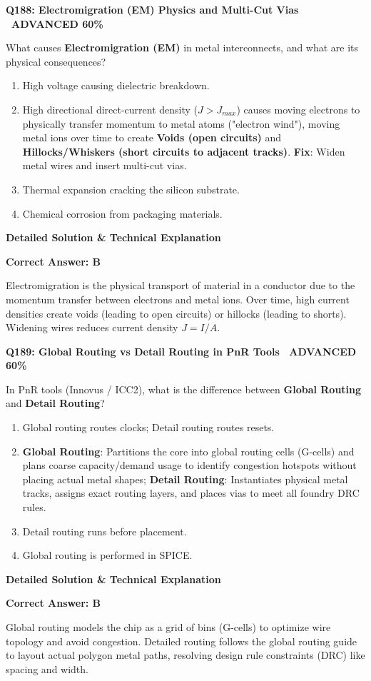 \documentclass[11pt,a4paper]{article}
\newcommand{\badgeadv}{{\color{white}\colorbox{advred}{\bfseries\sffamily\tiny\ ADVANCED 60\%\ }}}
\newenvironment{qbox}[2]{%
  \begin{mdframed}[style=qstyle]%
  {\bfseries\sffamily\color{primaryblue}#1 \hfill #2}\par\vspace{2pt}%
}{%
  \end{mdframed}%
}
\newenvironment{ansbox}{%
  \begin{mdframed}[style=ansstyle]%
  {\bfseries\sffamily\color{ansgreen}\small Detailed Solution \& Technical Explanation}\par\vspace{2pt}\small%
}{%
  \end{mdframed}%
}
\begin{document}
\begin{qbox}{Q188: Electromigration (EM) Physics and Multi-Cut Vias}{\badgeadv}
What causes \textbf{Electromigration (EM)} in metal interconnects, and what are its physical consequences?
\begin{enumerate}[label=\textbf{\Alph*.}]
  \item High voltage causing dielectric breakdown.
  \item High directional direct-current density ($J > J_{max}$) causes moving electrons to physically transfer momentum to metal atoms ("electron wind"), moving metal ions over time to create \textbf{Voids (open circuits)} and \textbf{Hillocks/Whiskers (short circuits to adjacent tracks)}.  
  \textbf{Fix}: Widen metal wires and insert multi-cut vias.
  \item Thermal expansion cracking the silicon substrate.
  \item Chemical corrosion from packaging materials.
\end{enumerate}
\end{qbox}
\begin{ansbox}
\textbf{Correct Answer: B}

Electromigration is the physical transport of material in a conductor due to the momentum transfer between electrons and metal ions. Over time, high current densities create voids (leading to open circuits) or hillocks (leading to shorts). Widening wires reduces current density $J = I/A$.
\end{ansbox}

\begin{qbox}{Q189: Global Routing vs Detail Routing in PnR Tools}{\badgeadv}
In PnR tools (Innovus / ICC2), what is the difference between \textbf{Global Routing} and \textbf{Detail Routing}?
\begin{enumerate}[label=\textbf{\Alph*.}]
  \item Global routing routes clocks; Detail routing routes resets.
  \item \textbf{Global Routing}: Partitions the core into global routing cells (G-cells) and plans coarse capacity/demand usage to identify congestion hotspots without placing actual metal shapes; \textbf{Detail Routing}: Instantiates physical metal tracks, assigns exact routing layers, and places vias to meet all foundry DRC rules.
  \item Detail routing runs before placement.
  \item Global routing is performed in SPICE.
\end{enumerate}
\end{qbox}
\begin{ansbox}
\textbf{Correct Answer: B}

Global routing models the chip as a grid of bins (G-cells) to optimize wire topology and avoid congestion. Detailed routing follows the global routing guide to layout actual polygon metal paths, resolving design rule constraints (DRC) like spacing and width.
\end{ansbox}
\end{document}
